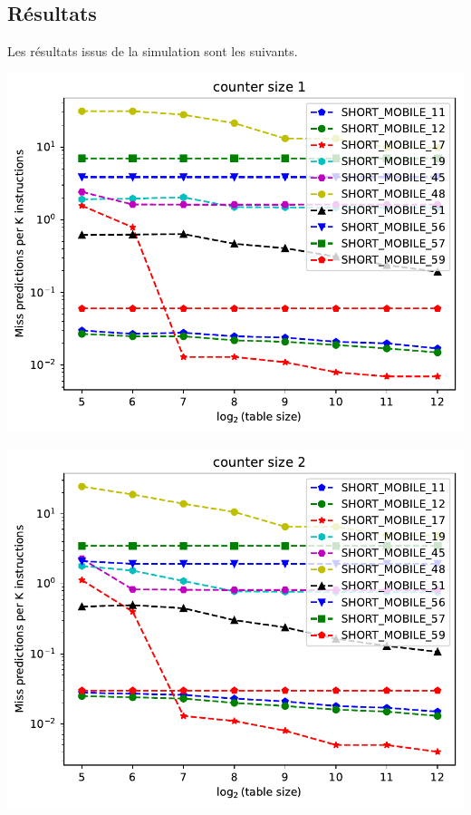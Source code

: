 \documentclass[a4paper]{article}
\begin{document}
\subsection{Résultats}
Les résultats issus de la simulation sont les suivants.
\par
\begin{minipage}{.48\linewidth}
\includegraphics[width=\linewidth]{default-predictor/graph_1}
\end{minipage}%
\hfill
\begin{minipage}{.48\linewidth}
\includegraphics[width=\linewidth]{default-predictor/graph_2}
\end{minipage}
\end{document}
